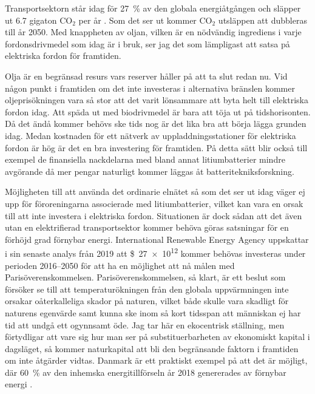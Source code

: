\documentclass{article}
\begin{document}
Transportsektorn står idag för \SI{27}{\percent} av den globala energiåtgången
och släpper ut \num{6.7} gigaton CO$_2$ per år \autocite{edenhofer15}.
Som det ser ut kommer CO$_2$ utsläppen att dubbleras till år 2050.
Med knappheten av oljan,
vilken är en nödvändig ingrediens i varje fordonsdrivmedel som idag är i bruk,
ser jag det som lämpligast att satsa på elektriska fordon för framtiden.

Olja är en begränsad resurs vars reserver håller på att ta slut redan nu.
Vid någon punkt i framtiden om det inte investeras i alternativa bränslen
kommer oljeprisökningen vara så stor att det varit lönsammare att byta helt
till elektriska fordon idag.
Att späda ut med biodrivmedel är bara att töja ut på tidshorisonten.
Då det ändå kommer behövs ske tids nog är det lika bra att börja lägga grunden idag.
Medan kostnaden för ett nätverk av uppladdningsstationer för elektriska fordon
är hög är det en bra investering för framtiden.
På detta sätt blir också till exempel de finansiella nackdelarna med
bland annat litiumbatterier mindre avgörande då
mer pengar naturligt kommer läggas åt batteritekniksforskning.

Möjligheten till att använda det ordinarie elnätet så som det ser ut idag
väger ej upp för föroreningarna associerade med litiumbatterier,
vilket kan vara en orsak till att inte investera i elektriska fordon.
Situationen är dock sådan att det även utan en elektrifierad transportsektor
kommer behöva göras satsningar för en förhöjd grad förnybar energi.
International Renewable Energy Agency uppskattar i sin senaste analys från 2019 \autocite{gielen19}
att \SI{27e12}[\$]{} kommer behövas investeras under perioden \numrange{2016}{2050}
för att ha en möjlighet att nå målen med Parisöverenskommelsen.
Parisöverenskommelsen, så klart, är ett beslut som försöker se till att
temperaturökningen från den globala uppvärmningen
inte orsakar oåterkalleliga skador på naturen,
vilket både skulle vara skadligt för naturens egenvärde
samt kunna ske inom så kort tidsspan att människan ej har tid
att undgå ett ogynnsamt öde.
Jag tar här en ekocentrisk ställning,
men förtydligar att vare sig hur man ser på substituerbarheten av ekonomiskt kapital i dagsläget,
så kommer naturkapital att bli den begränsande faktorn i framtiden om inte åtgärder vidtas.
Danmark är ett praktiskt exempel på att det är möjligt,
där \SI{60}{\percent} av den inhemska energitillförseln år 2018 genererades av förnybar energi
\autocite{energyindenmark2018}.
\end{document}
